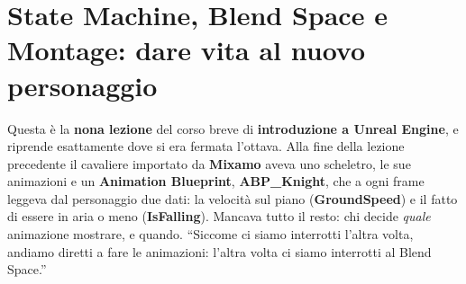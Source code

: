 %
%
%
%    
%

\chapter[State Machine, Blend Space e Montage]{State Machine, Blend Space e Montage:
dare vita al nuovo personaggio}
\label{ue9:cap:animazioni}

Questa è la \textbf{nona lezione} del corso breve di \textbf{introduzione a Unreal
Engine}, e riprende esattamente dove si era fermata l'ottava. Alla fine della lezione
precedente il cavaliere importato da \textbf{Mixamo} aveva uno scheletro, le sue
animazioni e un \textbf{Animation Blueprint}, \textbf{ABP\_Knight}, che a ogni frame
leggeva dal personaggio due dati: la velocità sul piano (\textbf{GroundSpeed}) e il fatto
di essere in aria o meno (\textbf{IsFalling}). Mancava tutto il resto: chi decide
\emph{quale} animazione mostrare, e quando. ``Siccome ci siamo interrotti l'altra volta,
andiamo diretti a fare le animazioni: l'altra volta ci siamo interrotti al Blend
Space.''

